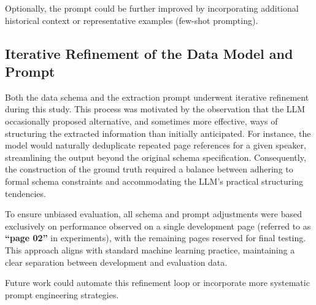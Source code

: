 Optionally, the prompt could be further improved by incorporating additional historical context or representative examples (few-shot prompting).


\subsection{Iterative Refinement of the Data Model and Prompt}
Both the data schema and the extraction prompt underwent iterative refinement during this study. This process was motivated by the observation that the LLM occasionally proposed alternative, and sometimes more effective, ways of structuring the extracted information than initially anticipated. For instance, the model would naturally deduplicate repeated page references for a given speaker, streamlining the output beyond the original schema specification. Consequently, the construction of the ground truth required a balance between adhering to formal schema constraints and accommodating the LLM’s practical structuring tendencies.

To ensure unbiased evaluation, all schema and prompt adjustments were based exclusively on performance observed on a single development page (referred to as \textbf{``page 02''} in experiments), with the remaining pages reserved for final testing. This approach aligns with standard machine learning practice, maintaining a clear separation between development and evaluation data.

Future work could automate this refinement loop or incorporate more systematic prompt engineering strategies.
